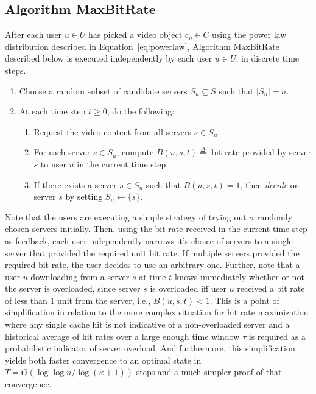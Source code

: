 \documentclass[conference]{IEEEtran}
\begin{document}
\subsection{Algorithm MaxBitRate}
After each user $u \in U$ has picked a video object $c_u \in C$ using the power law distribution described in Equation~\ref{eq:powerlaw}, Algorithm $\textrm{MaxBitRate}$ described below is executed independently by each user $u \in U$, in discrete time steps.
\begin{enumerate}
\item Choose a random subset of candidate servers $S_u \subseteq S$  such that $|S_u| = \sigma$.
\item At each time step $t \geq 0 $, do the following:
\begin{enumerate}
\item Request the video content from all servers $s \in S_u$.
\item For each server  $s \in S_u$, compute  $B(u,s, t) \stackrel{\Delta}{=}$ bit rate provided by server $s$ to user $u$ in the current time step.
\item If there exists a server $s \in S_u$ such that $B(u,s, t) = 1$, then {\em decide} on server $s$ by setting $S_u \leftarrow \{s\}$.
\end{enumerate}
\end{enumerate}
Note that the users are executing  a simple strategy of trying out $\sigma$ randomly chosen servers initially.  Then, using the bit rate received in the current time step as feedback, each user independently narrows it's choice of servers to a single server that provided the required unit bit rate. 
If multiple servers provided the required bit rate,  the user decides to use an arbitrary one. Further, note that a user $u$  downloading from a server $s$ at time $t$  knows  immediately whether or not the server is overloaded, since server $s$ is overloaded iff user $u$ received a bit rate of less than 1 unit from the server, i.e., $B(u,s,t) < 1$. This is a point of simplification in relation to the more complex situation for hit rate maximization where any single cache hit is not indicative of a non-overloaded server and a historical average of hit rates over a large enough time window $\tau$ is required as a probabilistic indicator of server overload. And furthermore, this simplification yields both faster convergence to an optimal state in $T = O(\log\log n/\log (\kappa + 1))$ steps and a much simpler proof of that convergence.
\end{document}
